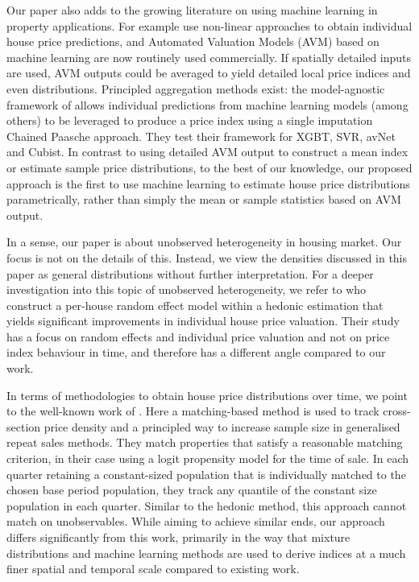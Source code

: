 Our paper also adds to the growing literature on using machine learning in property applications. For example \citet{kok_et_al2017} use non-linear approaches to obtain individual house price predictions, and Automated Valuation Models (AVM) based on machine learning are now routinely used commercially. If spatially detailed inputs are used, AVM outputs could be averaged to yield detailed local price indices and even distributions. Principled aggregation methods exist: the model-agnostic framework of \citet{calainho_et_al2022} allows individual predictions from machine learning models (among others) to be leveraged to produce a price index using a single imputation Chained Paasche approach. They test their framework for XGBT, SVR, avNet and Cubist. In contrast to using detailed AVM output to construct a mean index or estimate sample price distributions, to the best of our knowledge, our proposed approach is the first to use machine learning to estimate house price distributions parametrically, rather than simply the mean or sample statistics based on AVM output. 

In a sense, our paper is about unobserved heterogeneity in housing market. Our focus is not on the details of this. Instead, we view the densities discussed in this paper as general distributions without further interpretation.  For a deeper investigation into this topic of unobserved heterogeneity, we refer to \cite{francke_ree2021} who construct a per-house random effect model within a hedonic estimation that yields significant improvements in individual house price valuation. Their study has a focus on random effects and individual price valuation and not on price index behaviour in time, and therefore has a different angle compared to our work.

In terms of methodologies to obtain house price distributions over time, we point to the well-known work of \citet{mcmillen2012}. Here a matching-based method is used to track cross-section price density and a principled way to increase sample size in generalised repeat sales methods. They match properties that satisfy a reasonable matching criterion, in their case using a logit propensity model for the time of sale. In each quarter retaining a constant-sized population that is individually matched to the chosen base period population, they track any quantile of the constant size population in each quarter. Similar to the hedonic method, this approach cannot match on unobservables.  
While aiming to achieve similar ends, our approach differs significantly from this work, primarily in the way that mixture distributions and machine learning methods are used to derive indices at a much finer spatial and temporal scale compared to existing work. 

